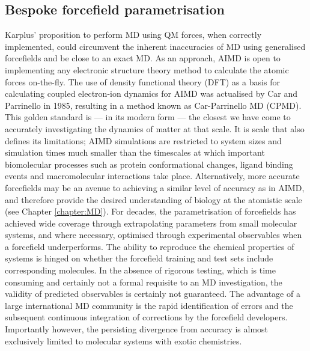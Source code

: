 \subsection{Bespoke forcefield parametrisation} \label{sec:ff_devel}
Karplus' proposition to perform MD using QM forces, when correctly implemented, could circumvent the inherent inaccuracies of MD using generalised forcefields and be close to an exact MD. As an approach, AIMD is open to implementing any electronic structure theory method to calculate the atomic forces on-the-fly. The use of density functional theory (DFT) as a basis for calculating coupled electron-ion dynamics for AIMD was actualised by Car and Parrinello in 1985, resulting in a method known as Car-Parrinello MD (CPMD).\cite{Car1985} \\

This golden standard is --- in its modern form --- the closest we have come to accurately investigating the dynamics of matter at that scale. It is scale that also defines its limitations; AIMD simulations are restricted to system sizes and simulation times much smaller than the timescales at which important biomolecular processes such as protein conformational changes, ligand binding events and macromolecular interactions take place. Alternatively, more accurate forcefields may be an avenue to achieving a similar level of accuracy as in AIMD, and therefore provide the desired understanding of biology at the atomistic scale (see Chapter \ref{chapter:MD}). For decades, the parametrisation of forcefields has achieved wide coverage through extrapolating parameters from small molecular systems, and where necessary, optimised through experimental observables when a forcefield underperforms.\cite{Siu2012} The ability to reproduce the chemical properties of systems is hinged on whether the forcefield training and test sets include corresponding molecules. In the absence of rigorous testing, which is time consuming and certainly not a formal requisite to an MD investigation, the validity of predicted observables is certainly not guaranteed. The advantage of a large international MD community is the rapid identification of errors and the subsequent continuous integration of corrections by the forcefield developers. Importantly however, the persisting divergence from accuracy is almost exclusively limited to molecular systems with exotic chemistries.

